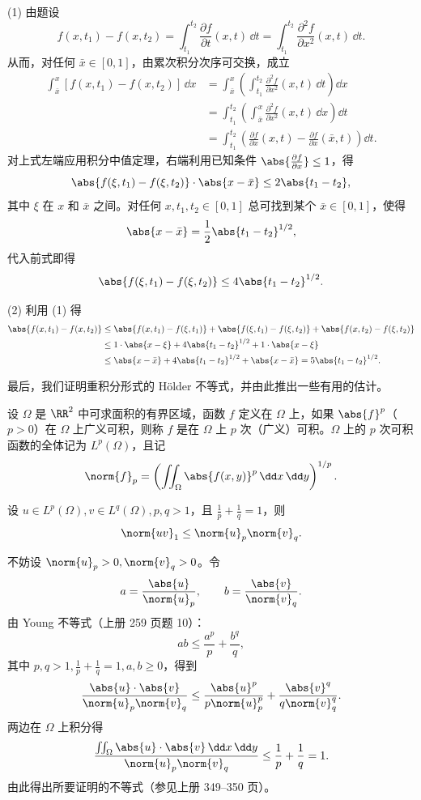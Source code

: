 \begin{xproof}
(1) 由题设
\[
  f(x,t_1)-f(x,t_2)=\int_{t_1}^{t_2}\frac{\partial f}{\partial t}(x,t)\,\dd t
  =\int_{t_1}^{t_2}\frac{\partial^2f}{\partial x^2}(x,t)\,\dd t.
\]
从而，对任何 $\bar x\in[0,1]$，由累次积分次序可交换，成立
\begin{align*}
  \int_{\bar x}^x[f(x,t_1)-f(x,t_2)]\,\dd x
  &=\int_{\bar x}^x\left(\int_{t_1}^{t_2}\frac{\partial^2f}{\partial x^2}(x,t)\,\dd t\right)\dd x\\
  &=\int_{t_1}^{t_2}\left(\int_{\bar x}^x\frac{\partial^2f}{\partial x^2}(x,t)\,\dd x\right)\dd t\\
  &=\int_{t_1}^{t_2}\left(\frac{\partial f}{\partial x}(x,t)-\frac{\partial f}{\partial x}(\bar x,t)\right)\dd t.
\end{align*}
对上式左端应用积分中值定理，右端利用已知条件 $\abs{\frac{\partial f}{\partial x}}\le1$，得
\[
  \abs{f(\xi,t_1)-f(\xi,t_2)}\cdot\abs{x-\bar x}\le2\abs{t_1-t_2},
\]
其中 $\xi$ 在 $x$ 和 $\bar x$ 之间。对任何 $x,t_1,t_2\in[0,1]$ 总可找到某个 $\bar x\in[0,1]$，使得
\[
  \abs{x-\bar x}=\frac12\abs{t_1-t_2}^{1/2},
\]
代入前式即得
\[
  \abs{f(\xi,t_1)-f(\xi,t_2)}\le4\abs{t_1-t_2}^{1/2}.
\]

(2) 利用 (1) 得
\begin{align*}
  \abs{f(x,t_1)-f(x,t_2)}
  &\le\abs{f(x,t_1)-f(\xi,t_1)}+\abs{f(\xi,t_1)-f(\xi,t_2)}+\abs{f(x,t_2)-f(\xi,t_2)}\\
  &\le1\cdot\abs{x-\xi}+4\abs{t_1-t_2}^{1/2}+1\cdot\abs{x-\xi}\\
  &\le\abs{x-\bar x}+4\abs{t_1-t_2}^{1/2}+\abs{x-\bar x}
  =5\abs{t_1-t_2}^{1/2}.
\end{align*}
\end{xproof}

最后，我们证明重积分形式的 Hölder 不等式，并由此推出一些有用的估计。

设 $\Omega$ 是 $\RR^2$ 中可求面积的有界区域，函数 $f$ 定义在 $\Omega$ 上，如果 $\abs{f}^p$（$p>0$）在 $\Omega$ 上广义可积，则称 $f$ 是在 $\Omega$ 上 $p$ 次（广义）可积。$\Omega$ 上的 $p$ 次可积函数的全体记为 $L^p(\Omega)$，且记
\[
  \norm{f}_p=\left(\iint_\Omega\abs{f(x,y)}^p\,\dd x\,\dd y\right)^{1/p}.
\]

\begin{xexample}
设 $u\in L^p(\Omega),v\in L^q(\Omega),p,q>1$，且 $\frac1p+\frac1q=1$，则
\[
  \norm{uv}_1\le\norm{u}_p\norm{v}_q.
\]
\end{xexample}
\begin{xproof}
不妨设 $\norm{u}_p>0,\norm{v}_q>0$。令
\[
  a=\frac{\abs{u}}{\norm{u}_p},\qquad b=\frac{\abs{v}}{\norm{v}_q}.
\]
由 Young 不等式（上册 259 页题 10）：
\[
  ab\le\frac{a^p}{p}+\frac{b^q}{q},
\]
其中 $p,q>1,\frac1p+\frac1q=1,a,b\ge0$，得到
\[
  \frac{\abs{u}\cdot\abs{v}}{\norm{u}_p\norm{v}_q}
  \le\frac{\abs{u}^p}{p\norm{u}_p^p}+\frac{\abs{v}^q}{q\norm{v}_q^q}.
\]
两边在 $\Omega$ 上积分得
\[
  \frac{\iint_\Omega\abs{u}\cdot\abs{v}\,\dd x\,\dd y}{\norm{u}_p\norm{v}_q}
  \le\frac1p+\frac1q=1.
\]
由此得出所要证明的不等式（参见上册 349--350 页）。
\end{xproof}

